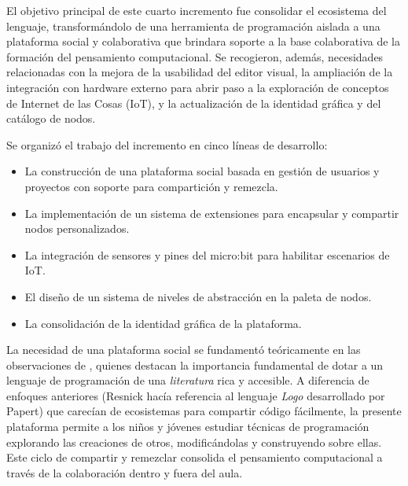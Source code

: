 
El objetivo principal de este cuarto incremento fue consolidar el ecosistema del lenguaje, transformándolo de una herramienta de programación aislada a una plataforma social y colaborativa que brindara soporte a la base colaborativa de la formación del pensamiento computacional. Se recogieron, además, necesidades relacionadas con la mejora de la usabilidad del editor visual, la ampliación de la integración con hardware externo para abrir paso a la exploración de conceptos de Internet de las Cosas (IoT), y la actualización de la identidad gráfica y del catálogo de nodos.

Se organizó el trabajo del incremento en cinco líneas de desarrollo:

\begin{itemize}
  \item La construcción de una plataforma social basada en gestión de usuarios y proyectos con soporte para compartición y remezcla.
  \item La implementación de un sistema de extensiones para encapsular y compartir nodos personalizados.
  \item La integración de sensores y pines del micro:bit para habilitar escenarios de IoT.
  \item El diseño de un sistema de niveles de abstracción en la paleta de nodos.
  \item La consolidación de la identidad gráfica de la plataforma.
\end{itemize}

La necesidad de una plataforma social se fundamentó teóricamente en las observaciones de , quienes destacan la importancia fundamental de dotar a un lenguaje de programación de una \emph{literatura} rica y accesible. A diferencia de enfoques anteriores (Resnick hacía referencia al lenguaje \emph{Logo} desarrollado por Papert) que carecían de ecosistemas para compartir código fácilmente, la presente plataforma permite a los niños y jóvenes estudiar técnicas de programación explorando las creaciones de otros, modificándolas y construyendo sobre ellas. Este ciclo de compartir y remezclar consolida el pensamiento computacional a través de la colaboración dentro y fuera del aula.

